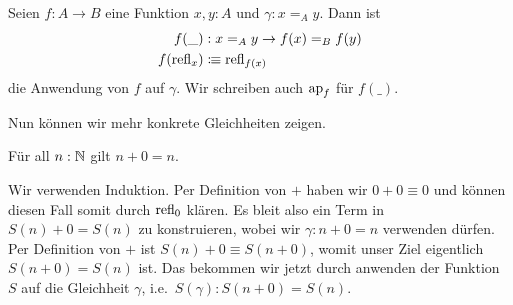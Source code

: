 \begin{definition}
  Seien $f:A\to B$ eine Funktion $x,y:A$ und $\gamma:x=_Ay$.
  Dann ist
  \begin{align*}
    f(\_) &: x=_Ay\to f(x)=_Bf(y) \\
    f(\mathrm{refl}_x)&\vcentcolon\mspace{-1.2mu}\equiv \mathrm{refl}_{f(x)}
  \end{align*}
  die Anwendung von $f$ auf $\gamma$. Wir schreiben auch $\mathrm{ap}_f$ für $f(\_)$.
\end{definition}

Nun können wir mehr konkrete Gleichheiten zeigen.

\begin{bemerkung}
  Für all $n:\mathbb{N}$ gilt $n+0=n$.
\end{bemerkung}
\begin{beweis}
  Wir verwenden Induktion.
  Per Definition von $+$ haben wir $0+0\equiv 0$ und können diesen Fall somit durch $\mathrm{refl}_0$ klären.
  Es bleit also ein Term in $S(n)+0=S(n)$ zu konstruieren, wobei wir $\gamma:n+0=n$ verwenden dürfen.
  Per Definition von $+$ ist $S(n)+0\equiv S(n+0)$, womit unser Ziel eigentlich $S(n+0)=S(n)$ ist.
  Das bekommen wir jetzt durch anwenden der Funktion $S$ auf die Gleichheit $\gamma$, i.e.\ $S(\gamma):S(n+0)=S(n)$.
\end{beweis}

